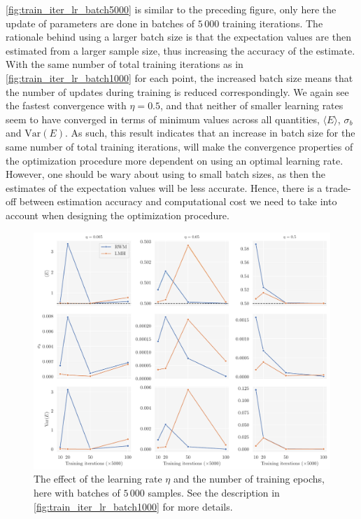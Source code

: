 \autoref{fig:train_iter_lr_batch5000} is similar to the preceding figure, only here the update of parameters are done in batches of $5\,000$ training iterations. The rationale behind using a larger batch size is that the expectation values are then estimated from a larger sample size, thus increasing the accuracy of the estimate. With the same number of total training iterations as in \autoref{fig:train_iter_lr_batch1000} for each point, the increased batch size means that the number of updates during training is reduced correspondingly. We again see the fastest convergence with $\eta=0.5$, and that neither of smaller learning rates seem to have converged in terms of minimum values across all quantities, $\langle E \rangle$, $\sigma_b$ and $\mathrm{Var}(E)$. As such, this result indicates that an increase in batch size for the same number of total training iterations, will make the convergence properties of the optimization procedure more dependent on using an optimal learning rate. However, one should be wary about using to small batch sizes, as then the estimates of the expectation values will be less accurate. Hence, there is a trade-off between estimation accuracy and computational cost we need to take into account when designing the optimization procedure. 

\begin{figure}[!htb]
\begin{center}\includegraphics[width=\textwidth]{latex/figures/training_cycles_lr.pdf}
\end{center}
\caption{The effect of the learning rate $\eta$ and the number of training epochs, here with batches of $5\,000$ samples. See the description in \autoref{fig:train_iter_lr_batch1000} for more details.}
\label{fig:train_iter_lr_batch5000}
\end{figure}

